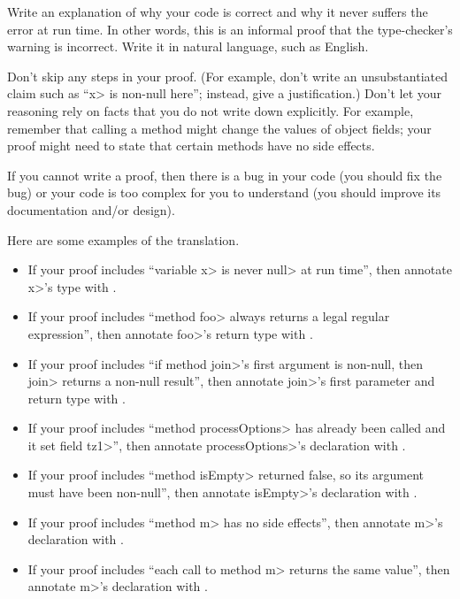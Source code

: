 Write an explanation of why your code is correct and why it
never suffers the error at run time.  In other words, this is an informal proof
that the type-checker's warning is incorrect.  Write it in natural language,
such as English.

Don't skip any steps in your proof.
(For example, don't write an unsubstantiated claim such as ``\<x> is
non-null here''; instead, give a justification.)
Don't let your reasoning rely on
facts that you do not write down explicitly.  For example, remember that
calling a method might change the values of object fields; your proof
might need to state that certain methods have no side effects.

If you cannot write a proof, then there is a bug
in your code (you should fix the bug) or your code is too complex for you
to understand (you should improve its documentation and/or design).


Here are some examples of the translation.

\begin{itemize}
\item
  If your proof includes ``variable \<x> is never \<null>
  at run time'', then annotate \<x>'s type with
  .
\item
  If your proof
  includes ``method \<foo> always returns a legal regular expression'',
  then annotate \<foo>'s return type with
  .
\item
  If your proof includes ``if method \<join>'s first argument is
  non-null, then \<join> returns a non-null result'', then annotate
  \<join>'s first parameter and return type with
  .
\item
  If your proof includes ``method \<processOptions> has already been called and it
  set field \<tz1>'', then annotate \<processOptions>'s declaration with
  .
\item
  If your proof includes ``method \<isEmpty> returned false, so its
  argument must have been non-null'', then annotate \<isEmpty>'s
  declaration with
  .
\item
  If your proof includes ``method \<m> has no side effects'',
  then annotate \<m>'s declaration with
  .

\item
  If your proof includes ``each call to method \<m> returns the same value'',
  then annotate \<m>'s declaration with
  .
\end{itemize}

